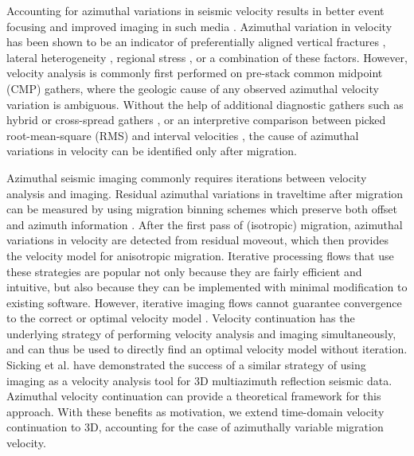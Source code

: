 Accounting for azimuthal variations in seismic velocity results in better event focusing and improved imaging in such media \cite[]{sicking_nelan08}.  
Azimuthal variation in velocity has been shown to be an indicator of preferentially aligned vertical fractures \cite[]{crampin84}, lateral heterogeneity \cite[]{GEO50-11-20262032}, regional stress \cite[]{sicking_nelan_mclain07}, or a combination of these factors.  
However, velocity analysis is commonly first performed on pre-stack common midpoint (CMP) gathers, where the geologic cause of any observed azimuthal velocity variation is ambiguous.  
Without the help of additional diagnostic gathers such as hybrid or cross-spread gathers \cite[]{GEO36-06-10991137}, or an interpretive comparison between picked root-mean-square (RMS) and interval velocities \cite[]{jenner08}, the cause of azimuthal variations in velocity can be identified only after migration.  

Azimuthal seismic imaging commonly requires iterations between velocity analysis and imaging.  
Residual azimuthal variations in traveltime after migration can be measured by using migration binning schemes which preserve both offset and azimuth information \cite[]{cary99,vermeer99}.
After the first pass of (isotropic) migration, azimuthal variations in velocity are detected from residual moveout, which then provides the velocity model for anisotropic migration.  
Iterative processing flows that use these strategies are popular not only because they are fairly efficient and intuitive, but also because they can be implemented with minimal modification to existing software.  However, iterative imaging flows cannot guarantee convergence to the correct or optimal velocity model \cite[]{FBR08-06-02240234}.  
Velocity continuation has the underlying strategy of performing velocity analysis and imaging simultaneously, and can thus be used to directly find an optimal velocity model without iteration.  
Sicking et al. \cite{sicking_nelan_mclain07} have demonstrated the success of a similar strategy of using imaging as a velocity analysis tool for 3D multiazimuth reflection seismic data.  
Azimuthal velocity continuation can provide a theoretical framework for this approach.  
With these benefits as motivation, we extend time-domain velocity continuation to 3D, accounting for the case of azimuthally variable migration velocity.

